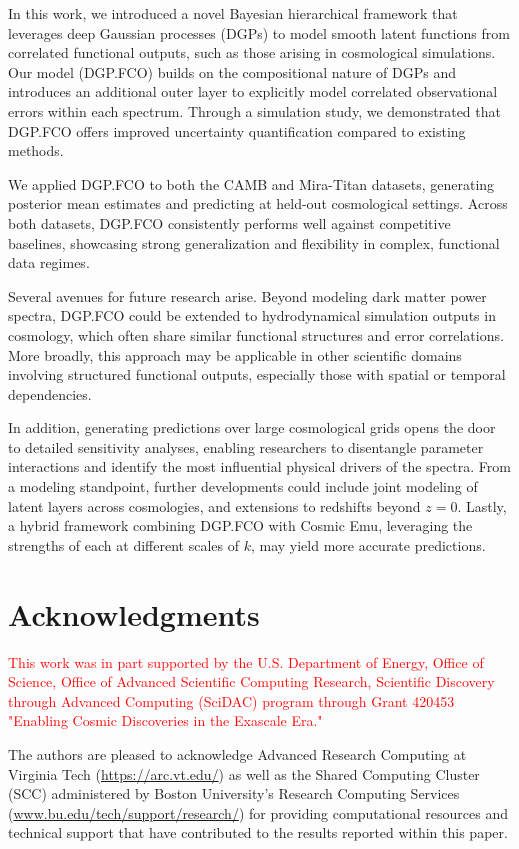 \documentclass[11pt]{article}
\begin{document}
In this work, we introduced a novel Bayesian hierarchical framework that leverages deep 
Gaussian processes (DGPs) to model smooth latent functions from correlated functional outputs, 
such as those arising in cosmological simulations. Our model (DGP.FCO) builds on the 
compositional nature of DGPs and introduces an additional outer layer to explicitly 
model correlated observational errors within each spectrum. Through a simulation study, 
we demonstrated that DGP.FCO offers improved uncertainty 
quantification compared to existing methods.

We applied DGP.FCO to both the CAMB and Mira-Titan datasets, generating posterior mean estimates 
and predicting at held-out cosmological settings. Across both datasets, DGP.FCO 
consistently performs well against competitive baselines, showcasing strong generalization and 
flexibility in complex, functional data regimes.

Several avenues for future research arise. Beyond modeling dark matter power 
spectra, DGP.FCO could be extended to hydrodynamical simulation outputs in cosmology, which 
often share similar functional structures and error correlations. More broadly, this approach may be 
applicable in other scientific domains involving structured functional outputs, especially those 
with spatial or temporal dependencies.

In addition, generating predictions over large cosmological grids opens the door to detailed 
sensitivity analyses, enabling researchers to disentangle parameter interactions and identify 
the most influential physical drivers of the spectra. From a modeling standpoint, further 
developments could include joint modeling of latent layers across cosmologies, and extensions 
to redshifts beyond $z=0$. Lastly, a hybrid framework combining DGP.FCO with Cosmic Emu, leveraging 
the strengths of each at different scales of $k$, may yield more accurate predictions.

\section{Acknowledgments}
\label{sec:ack}

\textcolor{red}{This work was in part supported by the U.S. Department
of Energy, Office of Science, Office of Advanced Scientific Computing Research, 
Scientific Discovery through Advanced Computing (SciDAC) program through 
Grant 420453 "Enabling Cosmic Discoveries in the Exascale Era."}

The authors are pleased to acknowledge Advanced Research Computing at Virginia Tech 
(\url{https://arc.vt.edu/}) as well as the Shared Computing Cluster (SCC) administered
by Boston University's Research Computing Services (\url{www.bu.edu/tech/support/research/})
for providing computational resources and technical support that have contributed 
to the results reported within this paper.
\end{document}
